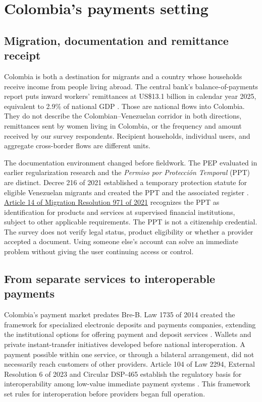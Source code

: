 \section{Colombia's payments setting}

\subsection{Migration, documentation and remittance receipt}
Colombia is both a destination for migrants and a country whose households receive income from people living abroad. The central bank's balance-of-payments report puts inward workers' remittances at US\$13.1 billion in calendar year 2025, equivalent to 2.9\% of national GDP \citep{banrepbop2026}. Those are national flows into Colombia. They do not describe the Colombian--Venezuelan corridor in both directions, remittances sent by women living in Colombia, or the frequency and amount received by our survey respondents. Recipient households, individual users, and aggregate cross-border flows are different units.

The documentation environment changed before fieldwork. The PEP evaluated in earlier regularization research and the \emph{Permiso por Protección Temporal} (PPT) are distinct. Decree 216 of 2021 established a temporary protection statute for eligible Venezuelan migrants and created the PPT and the associated register \citep{decree216}. \href{https://www.cancilleria.gov.co/normograma/compilacion/docs/pdf/resolucion_uaemc_0971_2021.pdf}{Article 14 of Migration Resolution 971 of 2021} recognizes the PPT as identification for products and services at supervised financial institutions, subject to other applicable requirements. The PPT is not a citizenship credential. The survey does not verify legal status, product eligibility or whether a provider accepted a document. Using someone else's account can solve an immediate problem without giving the user continuing access or control.

\subsection{From separate services to interoperable payments}
Colombia's payment market predates Bre-B. Law 1735 of 2014 created the framework for specialized electronic deposits and payments companies, extending the institutional options for offering payment and deposit services \citep{law1735}. Wallets and private instant-transfer initiatives developed before national interoperation. A payment possible within one service, or through a bilateral arrangement, did not necessarily reach customers of other providers. Article 104 of Law 2294, External Resolution 6 of 2023 and Circular DSP-465 establish the regulatory basis for interoperability among low-value immediate payment systems \citep{banrepreg,banreptechnical2026}. This framework set rules for interoperation before providers began full operation.

